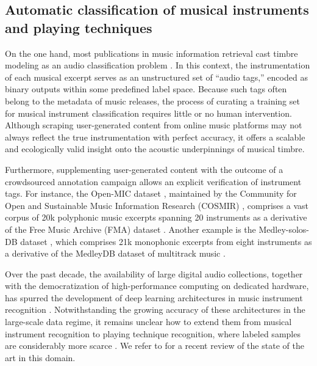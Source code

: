 \documentclass{bmcart}
\newcommand{\ja}[1]{\textcolor{purple}{JA: #1}\xspace}
\begin{document}
\subsection*{Automatic classification of musical instruments and playing techniques}
On the one hand, most publications in music information retrieval cast timbre modeling as an audio classification problem  \cite{martin1998asa,brown1999jasa,eronen2000icassp,herrera2003jnmr,wieczorkowska2003jiis,livshin2004dafx,krishna2004icassp,kaminskyj2005jiis,benetos2006icassp,bhalke2016jiis}.
In this context, the instrumentation of each musical excerpt serves as an unstructured set of ``audio tags,'' encoded as binary outputs within some predefined label space.
Because such tags often belong to the metadata of music releases, the process of curating a training set for musical instrument classification requires little or no human intervention.
Although scraping user-generated content from online music platforms may not always reflect the true instrumentation with perfect accuracy, it offers a scalable and ecologically valid insight onto the acoustic underpinnings of musical timbre.

Furthermore, supplementing user-generated content with the outcome of a crowdsourced annotation campaign allows an explicit verification of instrument tags.
For instance, the Open-MIC dataset \cite{humphrey2018ismir}, maintained by the Community for Open and Sustainable Music Information Research (COSMIR) \cite{mcfee2016ismir}, comprises a vast corpus of 20k polyphonic music excerpts spanning 20 instruments as a derivative of the Free Music Archive (FMA) dataset \cite{defferrard2017ismir}. %
Another example is the Medley-solos-DB dataset \cite{lostanlen2016ismir}, which comprises 21k monophonic excerpts from eight instruments as a derivative of the MedleyDB dataset of multitrack music \cite{bittner2014ismir}.

Over the past decade, the availability of large digital audio collections, together with the democratization of high-performance computing on dedicated hardware, has spurred the development of deep learning architectures in music instrument recognition \cite{mcfee2015ismir,pons2017eusipco,gururani2018ismir}.
Notwithstanding the growing accuracy of these architectures in the large-scale data regime, it remains unclear how to extend them from musical instrument recognition to playing technique recognition, where labeled samples are considerably more scarce \cite{loureiro2004ismir}.
We refer to \cite{han2017taslp} for a recent review of the state of the art in this domain.
\end{document}

